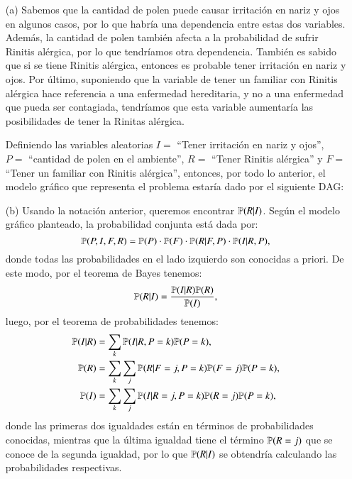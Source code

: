 \documentclass[
	spanish, %
	letterpaper, oneside
]{article}
\begin{document}
\begin{enumerate}
	\item[(a)] Sabemos que la cantidad de polen puede causar irritación en nariz y ojos en algunos casos, por lo que habría una dependencia entre estas dos variables. Además, la cantidad de polen también afecta a la probabilidad de sufrir Rinitis alérgica, por lo que tendríamos otra dependencia. También es sabido que si se tiene Rinitis alérgica, entonces es probable tener irritación en nariz y ojos. Por último, suponiendo que la variable de tener un familiar con Rinitis alérgica hace referencia a una enfermedad hereditaria, y no a una enfermedad que pueda ser contagiada, tendríamos que esta variable aumentaría las posibilidades de tener la Rinitas alérgica.

	Definiendo las variables aleatorias \(I=\) ``Tener irritación en nariz y ojos'', \(P=\) ``cantidad de polen en el ambiente'', \(R=\) ``Tener Rinitis alérgica'' y \(F=\) ``Tener un familiar con Rinitis alérgica'', entonces, por todo lo anterior, el modelo gráfico que representa el problema estaría dado por el siguiente DAG:

\begin{center}\end{center}

\item[(b)] Usando la notación anterior, queremos encontrar \(\P(R|I)\). Según el modelo gráfico planteado, la probabilidad conjunta está dada por:\[\P(P,I,F,R)=\P(P)\cdot\P(F)\cdot\P(R|F,P)\cdot\P(I|R,P),\]
donde todas las probabilidades en el lado izquierdo son conocidas a priori. De este modo, por el teorema de Bayes tenemos:\[\P(R|I)=\frac{\P(I|R)\P(R)}{\P(I)},\]
luego, por el teorema de probabilidades tenemos:\begin{align*}
	\P(I|R)&=\sum_{k}\P(I|R,P=k)\P(P=k),\\
	\P(R)&=\sum_{k}\sum_{j}\P(R|F=j,P=k)\P(F=j)\P(P=k),\\
	\P(I)&=\sum_{k}\sum_{j}\P(I|R=j,P=k)\P(R=j)\P(P=k),
\end{align*}
donde las primeras dos igualdades están en términos de probabilidades conocidas, mientras que la última igualdad tiene el término \(\P(R=j)\) que se conoce de la segunda igualdad, por lo que \(\P(R|I)\) se obtendría calculando las probabilidades respectivas.


\end{enumerate}
\end{document}
